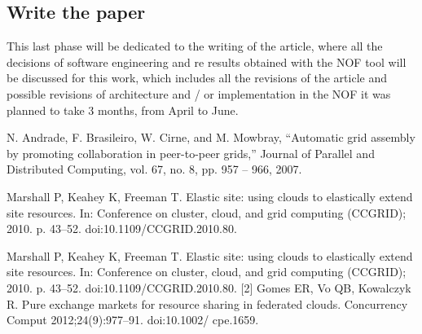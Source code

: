 \documentclass{article}
\begin{document}
\subsection{Write the paper}
    This last phase will be dedicated to the writing of the article, where all the decisions of software engineering and re results obtained with the NOF tool will be discussed for this work, which includes all the revisions of the article and possible revisions of architecture and / or implementation in the NOF it was planned to take 3 months, from April to June.

\begin{thebibliography}{9}

N. Andrade, F. Brasileiro, W. Cirne, and M. Mowbray, “Automatic grid
assembly by promoting collaboration in peer-to-peer grids,” Journal of
Parallel and Distributed Computing, vol. 67, no. 8, pp. 957 – 966, 2007.

Marshall P, Keahey K, Freeman T. Elastic site: using clouds to elastically extend site resources. In: Conference on cluster, cloud, and grid computing
(CCGRID); 2010. p. 43–52. doi:10.1109/CCGRID.2010.80.

Marshall P, Keahey K, Freeman T. Elastic site: using clouds to elastically extend site resources. In: Conference on cluster, cloud, and grid computing
(CCGRID); 2010. p. 43–52. doi:10.1109/CCGRID.2010.80.
[2] Gomes ER, Vo QB, Kowalczyk R. Pure exchange markets for resource sharing in federated clouds. Concurrency Comput 2012;24(9):977–91. doi:10.1002/
cpe.1659.
\end{thebibliography}
    
\end{document}

